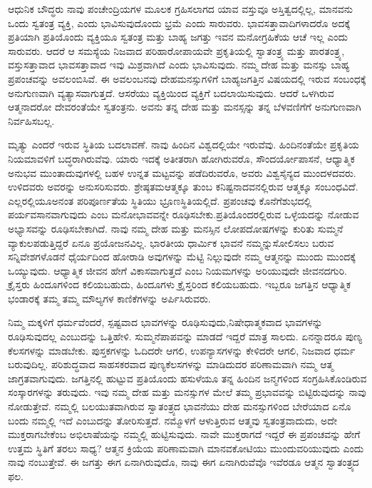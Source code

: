 ಆಧುನಿಕ ಬೌದ್ಧರು ನಾವು ಪಂಚೇಂದ್ರಿಯಗಳ ಮೂಲಕ ಗ್ರಹಿಸಲಾಗದ ಯಾವ ವಸ್ತುವೂ ಅಸ್ತಿತ್ವದಲ್ಲಿಲ್ಲ, ಮಾನವನು ಒಂದು ಸ್ವತಂತ್ರ ವ್ಯಕ್ತಿ, ಎಂದು ಭಾವಿಸುವುದೊಂದು ಭ್ರಮೆ ಎಂದು ಸಾರುವರು. ಭಾವಸತ್ತಾವಾದಿಗಳಾದರೊ  ಅದಕ್ಕೆ ಪ್ರತಿಯಾಗಿ ಪ್ರತಿಯೊಂದು ವ್ಯಕ್ತಿಯೂ ಸ್ವತಂತ್ರ ಮತ್ತು ಬಾಹ್ಯ ಜಗತ್ತು ಇವನ ಮನೋಗ್ರಹಿಕೆಯ ಆಚೆ ಇಲ್ಲ ಎಂದು ಸಾರುವರು. ಆದರೆ ಆ ಸಮಸ್ಯೆಯ ನಿಜವಾದ ಪರಿಹಾರೋಪಾಯವೇ ಪ್ರಕೃತಿಯಲ್ಲಿ ಸ್ವಾತಂತ್ರ್ಯ ಮತ್ತು ಪಾರತಂತ್ರ್ಯ, ವಸ್ತುಸತ್ತಾವಾದ ಭಾವಸತ್ತಾವಾದ ಇವು ಮಿಶ್ರವಾಗಿದೆ ಎಂದು ಭಾವಿಸುವುದು. ನಮ್ಮ ದೇಹ ಮತ್ತು ಮನಸ್ಸು ಬಾಹ್ಯ ಪ್ರಪಂಚವನ್ನು ಅವಲಂಬಿಸಿವೆ. ಈ ಅವಲಂಬನವು ದೇಹಮನಸ್ಸುಗಳಿಗೆ ಬಾಹ್ಯಜಗತ್ತಿನ ವಿಷಯದಲ್ಲಿ ಇರುವ ಸಂಬಂಧಕ್ಕೆ ಅನುಗುಣವಾಗಿ ವ್ಯತ್ಯಾಸವಾಗುತ್ತದೆ. ಆಸರೆಯು ವ್ಯಕ್ತಿಯಿಂದ ವ್ಯಕ್ತಿಗೆ ಬದಲಾಯಿಸುವುದು. ಆದರೆ ಒಳಗಿರುವ ಆತ್ಮನಾದರೋ ದೇವರಂತೆಯೇ ಸ್ವತಂತ್ರನು. ಅವನು ತನ್ನ ದೇಹ ಮತ್ತು ಮನಸ್ಸನ್ನು ತನ್ನ ಬೆಳವಣಿಗೆಗೆ ಅನುಗುಣವಾಗಿ ನಿರ್ವಹಿಸಬಲ್ಲ.

ಮೃತ್ಯು ಎಂದರೆ ಇರುವ ಸ್ಥಿತಿಯ ಬದಲಾವಣೆ. ನಾವು ಹಿಂದಿನ ವಿಶ್ವದಲ್ಲಿಯೇ ಇರುವೆವು. ಹಿಂದಿನಂತೆಯೇ ಪ್ರಕೃತಿಯ ನಿಯಮಾವಳಿಗೆ ಬದ್ಧರಾಗಿರುವೆವು. ಯಾರು ಇದಕ್ಕೆ ಅತೀತರಾಗಿ ಹೋಗಿರುವರೊ, ಸೌಂದರ್ಯೋಪಾಸನೆ, ಆಧ್ಯಾತ್ಮಿಕ ಅನುಭವ ಮುಂತಾದುವುಗಳಲ್ಲಿ ಬಹಳ ಉನ್ನತ ಮಟ್ಟವನ್ನು ಪಡೆದಿರುವರೊ, ಅವರು ವಿಶ್ವ\break ಸೈನ್ಯದ ಮುಂದಳದವರು. ಉಳಿದವರು ಅವರನ್ನು ಅನುಸರಿಸುವರು. ಶ್ರೇಷ್ಠತಮ\break ಆತ್ಮಕ್ಕೂ ತುಂಬ ಕನಿಷ್ಟನಾದವನಲ್ಲಿರುವ ಆತ್ಮಕ್ಕೂ ಸಂಬಂಧವಿದೆ. ಎಲ್ಲರಲ್ಲಿಯೂ\break ಅನಂತ ಪರಿಪೂರ್ಣತೆಯ ಸ್ಥಿತಿಯು ಭ್ರೂಣಸ್ಥಿತಿಯಲ್ಲಿದೆ. ಪ್ರಪಂಚವು ಕೊನೆಗೆ\break ಶುಭದಲ್ಲಿ ಪರ್ಯವಸಾನವಾಗುವುದು ಎಂಬ ಮನೋಭಾವವನ್ನೇ ರೂಢಿಸಬೇಕು.\break ಪ್ರತಿಯೊಂದರಲ್ಲಿರುವ ಒಳ್ಳೆಯದನ್ನು ನೋಡುವ ಅಭ್ಯಾಸವನ್ನು ರೂಢಿಸಬೇಕಾಗಿದೆ. ನಾವು ನಮ್ಮ ದೇಹ ಮತ್ತು ಮನಸ್ಸಿನ ಲೋಪದೋಷಗಳನ್ನು ಕುರಿತು ಸುಮ್ಮನೆ ವ್ಯಾಕುಲಪಡುತ್ತಿದ್ದರೆ ಏನೂ ಪ್ರಯೋಜನವಿಲ್ಲ. ಭಾರತೀಯ ಧಾರ್ಮಿಕ ಭಾವನೆ
 ನಮ್ಮನ್ನು\break ಸೋಲಿಸಲು ಬರುವ ಸನ್ನಿವೇಶಗಳೊಡನೆ ಧೈರ್ಯದಿಂದ ಹೋರಾಡಿ ಅವುಗಳನ್ನು ಮೆಟ್ಟಿ ನಿಲ್ಲುವುದೇ ನಮ್ಮ ಆತ್ಮನನ್ನು ಮುಂದು ಮುಂದಕ್ಕೆ ಒಯ್ಯುವುದು. ಆಧ್ಯಾತ್ಮಿಕ ಜೀವನ ಹೇಗೆ ವಿಕಾಸವಾಗುತ್ತದೆ ಎಂಬ ನಿಯಮಗಳನ್ನು ಅರಿಯುವುದೇ ಜೀವನದಗುರಿ. ಕ್ರೈಸ್ತರು ಹಿಂದೂಗಳಿಂದ ಕಲಿಯಬಹುದು, ಹಿಂದೂಗಳು ಕ್ರೈಸ್ತರಿಂದ ಕಲಿಯಬಹುದು. ಇಬ್ಬರೂ ಜಗತ್ತಿನ ಆಧ್ಯಾತ್ಮಿಕ ಭಂಡಾರಕ್ಕೆ ತಮ್ಮ ತಮ್ಮ ಮೌಲ್ಯಗಳ ಕಾಣಿಕೆಗಳನ್ನು ಅರ್ಪಿಸಿರುವರು.

ನಿಮ್ಮ ಮಕ್ಕಳಿಗೆ ಧರ್ಮವೆಂದರೆ, ಸ್ಪಷ್ಟವಾದ ಭಾವಗಳನ್ನು ರೂಢಿಸುವುದು,\break ನಿಷೇಧಾತ್ಮಕವಾದ ಭಾವಗಳನ್ನು ರೂಢಿಸುವುದಲ್ಲ ಎಂಬುದನ್ನು ಒತ್ತಿಹೇಳಿ. ಸುಮ್ಮನೆ\break ಪಾಪವನ್ನು ಮಾಡದೆ ಇದ್ದರೆ ಮಾತ್ರ ಸಾಲದು. ಏನನ್ನಾದರೂ ಪುಣ್ಯ ಕೆಲಸಗಳನ್ನು ಮಾಡಬೇಕು. ಪುಸ್ತಕಗಳನ್ನು ಓದಿದರೇ ಆಗಲಿ, ಉಪನ್ಯಾಸಗಳನ್ನು ಕೇಳಿದರೇ ಆಗಲಿ, ನಿಜವಾದ ಧರ್ಮ ಬರುವುದಿಲ್ಲ. ಪರಿಶುದ್ಧವಾದ ಸಾಹಸಕರವಾದ ಪುಣ್ಯಕೆಲಸಗಳನ್ನು ಮಾಡಿದುದರ ಪರಿಣಾಮವಾಗಿ ನಮ್ಮ ಆತ್ಮ ಜಾಗ್ರತವಾಗುವುದು. ಜಗತ್ತಿನಲ್ಲಿ ಹುಟ್ಟುವ ಪ್ರತಿಯೊಂದು ಹಸುಳೆಯೂ ತನ್ನ ಹಿಂದಿನ ಜನ್ಮಗಳಿಂದ ಸಂಗ್ರಹಿಸಿಕೊಂಡಿರುವ ಸಂಸ್ಕಾರಗಳನ್ನು ತರುವುದು. ಇವು ನಮ್ಮ ದೇಹ ಮತ್ತು ಮನಸ್ಸುಗಳ ಮೇಲೆ ತಮ್ಮ ಪ್ರಭಾವವನ್ನು ಬಿಟ್ಟಿರುವುದನ್ನು ನಾವು ನೋಡುತ್ತೇವೆ. ನಮ್ಮಲ್ಲಿ ಬಲಯುತವಾಗಿರುವ ಸ್ವಾತಂತ್ರ್ಯದ ಭಾವನೆಯು ದೇಹ ಮನಸ್ಸುಗಳಿಂದ ಬೇರೆಯಾದ ಏನೊ ಬಂದು ನಮ್ಮಲ್ಲಿ ಇದೆ ಎಂಬುದನ್ನು ತೋರಿಸುತ್ತದೆ. ನಮ್ಮೊಳಗೆ ಆಳುತ್ತಿರುವ ಆತ್ಮವು ಸ್ವತಂತ್ರವಾದುದು, ಅದೇ ಮುಕ್ತರಾಗಬೇಕೆಂಬ ಅಭಿಲಾಷೆಯನ್ನು ನಮ್ಮಲ್ಲಿ ಹುಟ್ಟಿಸುವುದು. ನಾವೇ ಮುಕ್ತರಾಗದೆ ಇದ್ದರೆ ಈ ಪ್ರಪಂಚವನ್ನು ಹೇಗೆ ಉತ್ತಮ ಸ್ಥಿತಿಗೆ ತರಲು ಸಾಧ್ಯ? ಆತ್ಮನ ಕ್ರಿಯೆಯ ಪರಿಣಾಮವಾಗಿ ಮಾನವಕೋಟಿಯು ಮುಂದುವರಿಯುವುದು ಎಂದು ನಾವು ನಂಬುತ್ತೇವೆ. ಈ ಜಗತ್ತು ಈಗ ಏನಾಗಿರುವುದೊ, ನಾವು ಈಗ ಏನಾಗಿರುವೆವೊ ಇವೆರಡೂ ಆತ್ಮನ ಸ್ವಾತಂತ್ರ್ಯದ ಫಲ.

